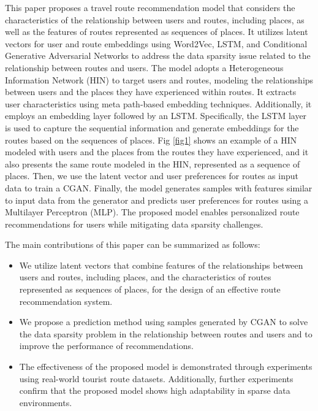 \documentclass[]{article}
\begin{document}
This paper proposes a travel route recommendation model that considers the characteristics of the relationship between users and routes, including places, as well as the features of routes represented as sequences of places. It utilizes latent vectors for user and route embeddings using Word2Vec, LSTM, and Conditional Generative Adversarial Networks to address the data sparsity issue related to the relationship between routes and users. The model adopts a Heterogeneous Information Network (HIN) to target users and routes, modeling the relationships between users and the places they have experienced within routes. It extracts user characteristics using meta path-based embedding techniques. Additionally, it employs an embedding layer followed by an LSTM. Specifically, the LSTM layer is used to capture the sequential information and generate embeddings for the routes based on the sequences of places.
Fig \ref{fig1} shows an example of a HIN modeled with users and the places from the routes they have experienced, and it also presents the same route modeled in the HIN, represented as a sequence of places. Then, we use the latent vector and user preferences for routes as input data to train a CGAN. Finally, the model generates samples with features similar to input data from the generator and predicts user preferences for routes using a Multilayer Perceptron (MLP). The proposed model enables personalized route recommendations for users while mitigating data sparsity challenges. 

The main contributions of this paper can be summarized as follows:

\begin{itemize}
	\item We utilize latent vectors that combine features of the relationships between users and routes, including places, and the characteristics of routes represented as sequences of places, for the design of an effective route recommendation system.
	\item We propose a prediction method using samples generated by CGAN to solve the data sparsity problem in the relationship between routes and users and to improve the performance of recommendations.
	\item The effectiveness of the proposed model is demonstrated through experiments using real-world tourist route datasets. Additionally, further experiments confirm that the proposed model shows high adaptability in sparse data environments.
\end{itemize}
\end{document}
